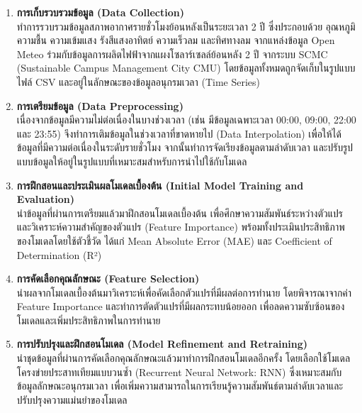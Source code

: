 \begin{enumerate}
    \item \textbf{การเก็บรวบรวมข้อมูล (Data Collection)} \\
    \hspace*{\parindent} ทำการรวบรวมข้อมูลสภาพอากาศรายชั่วโมงย้อนหลังเป็นระยะเวลา 2 ปี ซึ่งประกอบด้วย อุณหภูมิ ความชื้น ความเข้มแสง รังสีแสงอาทิตย์ ความเร็วลม และทิศทางลม จากแหล่งข้อมูล Open Meteo ร่วมกับข้อมูลการผลิตไฟฟ้าจากแผงโซลาร์เซลล์ย้อนหลัง 2 ปี จากระบบ SCMC (Sustainable Campus Management City CMU) โดยข้อมูลทั้งหมดถูกจัดเก็บในรูปแบบไฟล์ CSV และอยู่ในลักษณะของข้อมูลอนุกรมเวลา (Time Series)
    
    \item \textbf{การเตรียมข้อมูล (Data Preprocessing)} \\
    \hspace*{\parindent} เนื่องจากข้อมูลมีความไม่ต่อเนื่องในบางช่วงเวลา (เช่น มีข้อมูลเฉพาะเวลา 00:00, 09:00, 22:00 และ 23:55) จึงทำการเติมข้อมูลในช่วงเวลาที่ขาดหายไป (Data Interpolation) เพื่อให้ได้ข้อมูลที่มีความต่อเนื่องในระดับรายชั่วโมง จากนั้นทำการจัดเรียงข้อมูลตามลำดับเวลา และปรับรูปแบบข้อมูลให้อยู่ในรูปแบบที่เหมาะสมสำหรับการนำไปใช้กับโมเดล
    
    \item \textbf{การฝึกสอนและประเมินผลโมเดลเบื้องต้น (Initial Model Training and Evaluation)} \\
    \hspace*{\parindent} นำข้อมูลที่ผ่านการเตรียมแล้วมาฝึกสอนโมเดลเบื้องต้น เพื่อศึกษาความสัมพันธ์ระหว่างตัวแปร และวิเคราะห์ความสำคัญของตัวแปร (Feature Importance) พร้อมทั้งประเมินประสิทธิภาพของโมเดลโดยใช้ตัวชี้วัด ได้แก่ Mean Absolute Error (MAE) และ Coefficient of Determination (R²)
    
    \item \textbf{การคัดเลือกคุณลักษณะ (Feature Selection)} \\
    \hspace*{\parindent} นำผลจากโมเดลเบื้องต้นมาวิเคราะห์เพื่อคัดเลือกตัวแปรที่มีผลต่อการทำนาย โดยพิจารณาจากค่า Feature Importance และทำการตัดตัวแปรที่มีผลกระทบน้อยออก เพื่อลดความซับซ้อนของโมเดลและเพิ่มประสิทธิภาพในการทำนาย
    
    \item \textbf{การปรับปรุงและฝึกสอนโมเดล (Model Refinement and Retraining)} \\
    \hspace*{\parindent} นำชุดข้อมูลที่ผ่านการคัดเลือกคุณลักษณะแล้วมาทำการฝึกสอนโมเดลอีกครั้ง โดยเลือกใช้โมเดลโครงข่ายประสาทเทียมแบบวนซ้ำ (Recurrent Neural Network: RNN) ซึ่งเหมาะสมกับข้อมูลลักษณะอนุกรมเวลา เพื่อเพิ่มความสามารถในการเรียนรู้ความสัมพันธ์ตามลำดับเวลาและปรับปรุงความแม่นยำของโมเดล
    

\end{enumerate}
